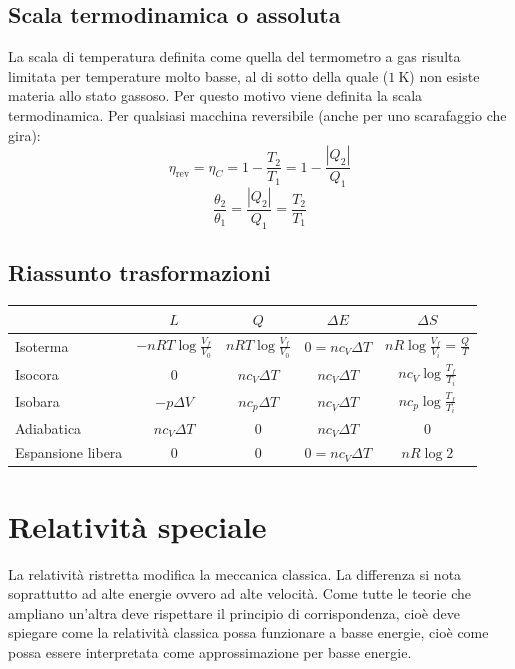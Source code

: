 \section{Scala termodinamica o assoluta}
La scala di temperatura definita come quella del termometro a gas risulta limitata per temperature molto basse, al di sotto della quale ($\SI{1}{\kelvin}$) non esiste materia allo stato gassoso. Per questo motivo viene definita la scala termodinamica. Per qualsiasi macchina reversibile (anche per uno scarafaggio che gira):
\[\eta_\text{rev}=\eta_C=1-\frac{T_2}{T_1}=1-\frac{|Q_2|}{Q_1}\]
\[\frac{\theta_2}{\theta_1}=\frac{|Q_2|}{Q_1}=\frac{T_2}{T_1}\]



\section{Riassunto trasformazioni}
\begin{center}
   \begin{tabular}{p{2cm}|cccc}
                        & $L$                       & $Q$                      & $\Delta E$       & $\Delta S$                          \\
      \hline
      Isoterma          & $-nRT\log\frac{V_f}{V_0}$ & $nRT\log\frac{V_f}{V_0}$ & $0=nc_V\Delta T$ & $nR\log\frac{V_f}{V_i}=\frac{Q}{T}$ \\
      Isocora           & $0$                       & $nc_V\Delta T$           & $nc_V\Delta T$   & $nc_V\log\frac{T_f}{T_i}$           \\
      Isobara           & $-p\Delta V$              & $nc_p\Delta T$           & $nc_V\Delta T$   & $nc_p\log\frac{T_f}{T_i}$           \\
      Adiabatica        & $nc_V\Delta T$            & $0$                      & $nc_V\Delta T$   & $0$                                 \\
      Espansione libera & $0$                       & $0$                      & $0=nc_V\Delta T$ & $nR\log 2$                          \\
   \end{tabular}
\end{center}


\chapter{Relatività speciale}
\minitoc
La relatività ristretta modifica la meccanica classica. La differenza si nota soprattutto ad alte energie ovvero ad alte velocità. Come tutte le teorie che ampliano un'altra deve rispettare il principio di corrispondenza, cioè deve spiegare come la relatività classica possa funzionare a basse energie, cioè come possa essere interpretata come approssimazione per basse energie.

